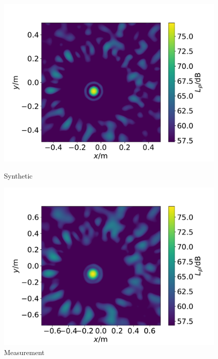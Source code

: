 \documentclass[12pt,pdftex,16x10]{elpres} %
\begin{document}
\begin{psli}
  \begin{figure}
    \begin{minipage}[b]{0.4\linewidth}
      \centering
      \includegraphics[width=\textwidth]{figs/datasets_beamforming_example_synthetic.pdf}
      \caption{Synthetic}
    \end{minipage}
    \begin{minipage}[b]{0.4\linewidth}
      \centering
      \includegraphics[width=\textwidth]{figs/datasets_beamforming_example_measurement.pdf}
      \caption{Measurement}
    \end{minipage}

\end{figure}
\end{psli}
\end{document}
